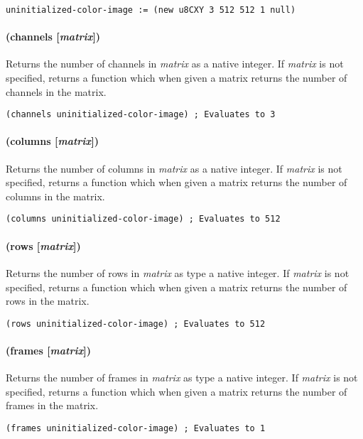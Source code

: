 \documentclass[twoside=false, numbers=noenddot]{scrbook}
\begin{document}
\begin{verbatim}
uninitialized-color-image := (new u8CXY 3 512 512 1 null)
\end{verbatim}

\paragraph{(channels [\emph{matrix}])}
Returns the number of channels in \emph{matrix} as a native integer.
If \emph{matrix} is not specified, returns a function which when given a matrix returns the number of channels in the matrix.

\begin{verbatim}
(channels uninitialized-color-image) ; Evaluates to 3
\end{verbatim}

\paragraph{(columns [\emph{matrix}])}
Returns the number of columns in \emph{matrix} as a native integer.
If \emph{matrix} is not specified, returns a function which when given a matrix returns the number of columns in the matrix.

\begin{verbatim}
(columns uninitialized-color-image) ; Evaluates to 512
\end{verbatim}

\paragraph{(rows [\emph{matrix}])}
Returns the number of rows in \emph{matrix} as type a native integer.
If \emph{matrix} is not specified, returns a function which when given a matrix returns the number of rows in the matrix.

\begin{verbatim}
(rows uninitialized-color-image) ; Evaluates to 512
\end{verbatim}

\paragraph{(frames [\emph{matrix}])}
Returns the number of frames in \emph{matrix} as type a native integer.
If \emph{matrix} is not specified, returns a function which when given a matrix returns the number of frames in the matrix.

\begin{verbatim}
(frames uninitialized-color-image) ; Evaluates to 1
\end{verbatim}
\end{document}
